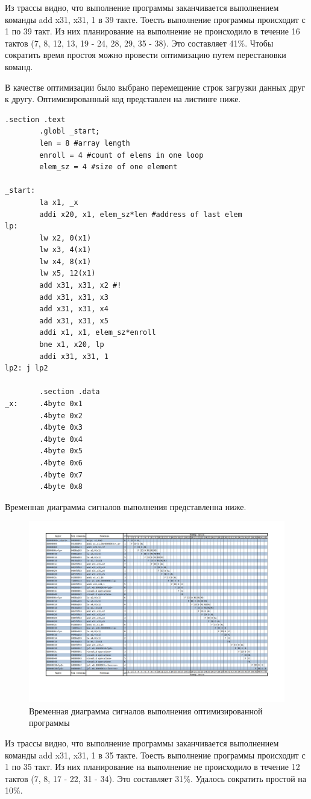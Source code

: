 Из трассы видно, что выполнение программы заканчивается выполнением команды add x31, x31, 1 в 39 такте. Тоесть выполнение программы происходит с 1 по 39 такт. Из них планирование на выполнение не происходило в течение 16 тактов (7, 8, 12, 13, 19 - 24, 28, 29, 35 - 38). Это составляет 41\%. Чтобы сократить время простоя можно провести оптимизацию путем перестановки команд. 

В качестве оптимизации было выбрано перемещение строк загрузки данных друг к другу. Оптимизированный код представлен на листинге ниже.

\newpage
\begin{lstlisting}[label=code, caption=Код оптимизированной программы]
  .section .text
        .globl _start;
        len = 8 #array length
        enroll = 4 #count of elems in one loop
		elem_sz = 4 #size of one element

_start:
        la x1, _x
        addi x20, x1, elem_sz*len #address of last elem
lp:
        lw x2, 0(x1)
        lw x3, 4(x1)
        lw x4, 8(x1)
        lw x5, 12(x1)
        add x31, x31, x2 #!
        add x31, x31, x3
        add x31, x31, x4
        add x31, x31, x5
        addi x1, x1, elem_sz*enroll
        bne x1, x20, lp
        addi x31, x31, 1
lp2: j lp2

        .section .data
_x:     .4byte 0x1
        .4byte 0x2
        .4byte 0x3
        .4byte 0x4
        .4byte 0x5
        .4byte 0x6
        .4byte 0x7
        .4byte 0x8
\end{lstlisting}
\newpage

Временная диаграмма сигналов выполнения представленна ниже.

\begin{figure}[h!]
	\begin{center}
		\includegraphics[scale=0.4]{assets/pipelineOpt.png}
	\end{center}
	\caption{Временная диаграмма сигналов выполнения оптимизированной программы}
\end{figure}

Из трассы видно, что выполнение программы заканчивается выполнением команды add x31, x31, 1 в 35 такте. Тоесть выполнение программы происходит с 1 по 35 такт. Из них планирование на выполнение не происходило в течение 12 тактов (7, 8, 17 - 22, 31 - 34). Это составляет 31\%. Удалось сократить простой на 10\%.